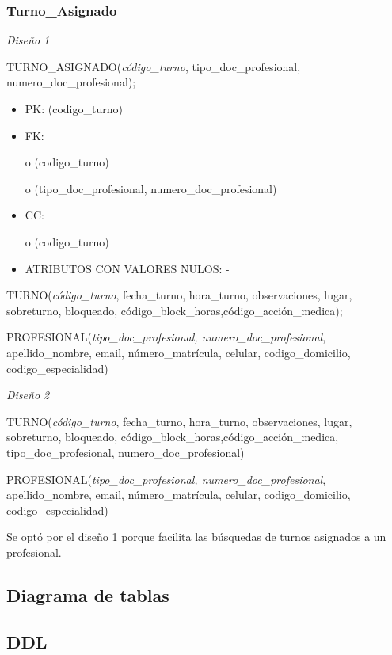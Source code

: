 \documentclass[a4paper,11pt]{article}
\begin{document}
\subsubsection{\textbf{Turno\_Asignado}}

\textit{Diseño 1}

TURNO\_ASIGNADO(\emph{código\_turno}, tipo\_doc\_profesional, numero\_doc\_profesional);

\begin{itemize}
\item PK: (codigo\_turno)

\item FK: 

o (codigo\_turno)

o (tipo\_doc\_profesional, numero\_doc\_profesional)

\item CC:

o (codigo\_turno)

\item ATRIBUTOS CON VALORES NULOS: -
\end{itemize}

TURNO(\emph{código\_turno}, fecha\_turno, hora\_turno, observaciones, lugar, sobreturno, 
bloqueado, código\_block\_horas,código\_acción\_medica);

PROFESIONAL(\emph{tipo\_doc\_profesional, numero\_doc\_profesional}, apellido\_nombre, 
email, número\_matrícula, celular,\textit{\textbf{ }}codigo\_domicilio, codigo\_especialidad)

\textit{Diseño 2}

TURNO(\emph{código\_turno}, fecha\_turno, hora\_turno, observaciones, lugar, sobreturno, 
bloqueado, código\_block\_horas,código\_acción\_medica, tipo\_doc\_profesional, 
numero\_doc\_profesional)

PROFESIONAL(\emph{tipo\_doc\_profesional, numero\_doc\_profesional}, apellido\_nombre, 
email, número\_matrícula, celular,\textit{\textbf{ }}codigo\_domicilio, codigo\_especialidad)

Se optó por el diseño 1 porque facilita las búsquedas de turnos asignados a 
un profesional.\pagebreak{}\label{HToc293405855}

\subsection{\textbf{Diagrama de tablas}}\pagebreak{}\label{HToc293405856}

\subsection{\textbf{DDL}}
\end{document}
